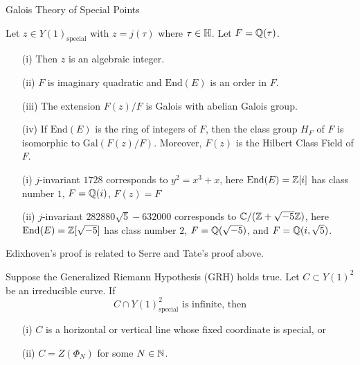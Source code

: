 \documentclass{beamer}
\begin{document}
\begin{frame}{Galois Theory of Special Points}  
  \begin{theorem}
    Let $z\in Y(1)_{\mathrm{special}}$ with $z=j(\tau)$ where
    $\tau\in {\mathbb{H}}$. Let $F={\mathbb{Q}}(\tau)$.
    \begin{enumerate}
    \item [(i)] Then $z$ is an algebraic integer.
    \item[(ii)]  $F$ is
      imaginary quadratic and   $\mathrm{End}(E)$ is an order
      in $F$.
    \item[(iii)] The extension $F(z)/F$ is Galois with abelian Galois
      group.
    \item[(iv)] If $\mathrm{End}(E)$ is the ring of integers of $F$, then
      the class group $H_F$ of $F$ is isomorphic to
      $\mathrm{Gal}(F(z)/F)$.
      Moreover, $F(z)$ is the Hilbert Class Field of $F$. 
    \end{enumerate}
  \end{theorem}
  \begin{example}
    \begin{enumerate}
    \item [(i)] $j$-invariant $1728$ corresponds to $y^2 = x^3+x$, here
      $\mathrm{End}(E) = {\mathbb{Z}}[i]$ has class number $1$,
      $F={\mathbb{Q}}(i)$,
      $F(z)=F$
    \end{enumerate}
  \end{example}
\end{frame}

\begin{frame}
  \begin{example}[continued]
    \begin{enumerate}
    \item[(ii)] $j$-invariant $282880 \sqrt{5}-632000$ corresponds to
      ${\mathbb{C}}/({\mathbb{Z}}+\sqrt{-5}{\mathbb{Z}})$, here $\mathrm{End}(E)={\mathbb{Z}}[\sqrt{-5}]$
      has class number $2$, $F={\mathbb{Q}}(\sqrt{-5})$, and $F =
      {\mathbb{Q}}(i,\sqrt{5})$. 
    \end{enumerate}
  \end{example}

  Edixhoven's proof is related to Serre and Tate's proof above.
  \begin{theorem}
    Suppose the Generalized Riemann Hypothesis (GRH) holds true. 
    Let $C\subset Y(1)^2$ be an irreducible curve. If
    \begin{equation*}
      C \cap Y(1)^2_{\mathrm{special}}\text{ is
        infinite, then}
    \end{equation*}
    \vspace{-0.75cm}
    \begin{enumerate}
    \item [(i)] $C$ is a horizontal or vertical line whose fixed coordinate
      is  special, or
    \item[(ii)] $C=Z(\Phi_N)$ for some $N\in{\mathbb{N}}$. 
    \end{enumerate}
  \end{theorem}
\end{frame}
\end{document}
